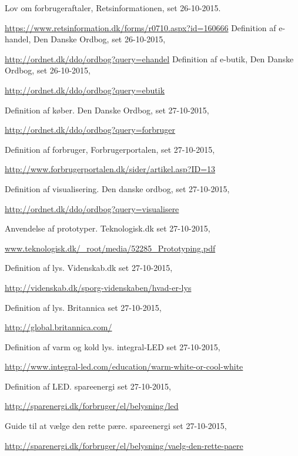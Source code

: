   Lov om forbrugeraftaler,
  Retsinformationen,
  set 26-10-2015.
  
  \url{https://www.retsinformation.dk/forms/r0710.aspx?id=160666}
  Definition af e-handel,
  Den Danske Ordbog,
  set 26-10-2015,
  
  \url{http://ordnet.dk/ddo/ordbog?query=ehandel}
  Definition af e-butik,
  Den Danske Ordbog,
  set 26-10-2015,
  
  \url{http://ordnet.dk/ddo/ordbog?query=ebutik}

  Definition af køber.
  Den Danske Ordbog,
  set 27-10-2015,
  
  \url{http://ordnet.dk/ddo/ordbog?query=forbruger}

  Definition af forbruger,
  Forbrugerportalen,
  set 27-10-2015,
  
  \url{http://www.forbrugerportalen.dk/sider/artikel.asp?ID=13}

  Definition af visualisering.
  Den danske ordbog,
  set 27-10-2015,
  
  \url{http://ordnet.dk/ddo/ordbog?query=visualisere}

  Anvendelse af prototyper.
  Teknologisk.dk
  set 27-10-2015,
  
  \url{www.teknologisk.dk/_root/media/52285_Prototyping.pdf}

  Definition af lys.
  Videnskab.dk
  set 27-10-2015,
  
  \url{http://videnskab.dk/sporg-videnskaben/hvad-er-lys}

  Definition af lys.
  Britannica
  set 27-10-2015,
  
  \url{http://global.britannica.com/}

  Definition af varm og kold lys.
  integral-LED
  set 27-10-2015,
  
  \url{http://www.integral-led.com/education/warm-white-or-cool-white}

  Definition af LED.
  spareenergi
  set 27-10-2015,
  
  \url{http://sparenergi.dk/forbruger/el/belysning/led}

  Guide til at vælge den rette pære.
  spareenergi
  set 27-10-2015,
  
  \url{http://sparenergi.dk/forbruger/el/belysning/vaelg-den-rette-paere}

